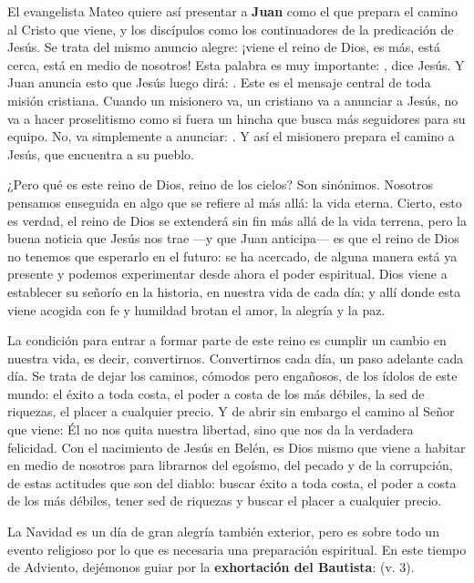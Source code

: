 \begin{body}
\begin{body}
El evangelista Mateo quiere así presentar a \textbf{Juan} como el que prepara el camino al Cristo que viene, y los discípulos como los continuadores de la predicación de Jesús. Se trata del mismo anuncio alegre: ¡viene el reino de Dios, es más, está cerca, está en medio de nosotros! Esta palabra es muy importante: , dice Jesús. Y Juan anuncia esto que Jesús luego dirá: . Este es el mensaje central de toda misión cristiana. Cuando un misionero va, un cristiano va a anunciar a Jesús, no va a hacer proselitismo como si fuera un hincha que busca más seguidores para su equipo. No, va simplemente a anunciar: . Y así el misionero prepara el camino a Jesús, que encuentra a su pueblo.

¿Pero qué es este reino de Dios, reino de los cielos? Son sinónimos. Nosotros pensamos enseguida en algo que se refiere al más allá: la vida eterna. Cierto, esto es verdad, el reino de Dios se extenderá sin fin más allá de la vida terrena, pero la buena noticia que Jesús nos trae ---y que Juan anticipa--- es que el reino de Dios no tenemos que esperarlo en el futuro: se ha acercado, de alguna manera está ya presente y podemos experimentar desde ahora el poder espiritual. Dios viene a establecer su señorío en la historia, en nuestra vida de cada día; y allí donde esta viene acogida con fe y humildad brotan el amor, la alegría y la paz.

La condición para entrar a formar parte de este reino es cumplir un cambio en nuestra vida, es decir, convertirnos. Convertirnos cada día, un paso adelante cada día. Se trata de dejar los caminos, cómodos pero engañosos, de los ídolos de este mundo: el éxito a toda costa, el poder a costa de los más débiles, la sed de riquezas, el placer a cualquier precio. Y de abrir sin embargo el camino al Señor que viene: Él no nos quita nuestra libertad, sino que nos da la verdadera felicidad. Con el nacimiento de Jesús en Belén, es Dios mismo que viene a habitar en medio de nosotros para librarnos del egoísmo, del pecado y de la corrupción, de estas actitudes que son del diablo: buscar éxito a toda costa, el poder a costa de los más débiles, tener sed de riquezas y buscar el placer a cualquier precio.

La Navidad es un día de gran alegría también exterior, pero es sobre todo un evento religioso por lo que es necesaria una preparación espiritual. En este tiempo de Adviento, dejémonos guiar por la \textbf{exhortación del Bautista}:  (v. 3).


\end{body}
\end{body}
